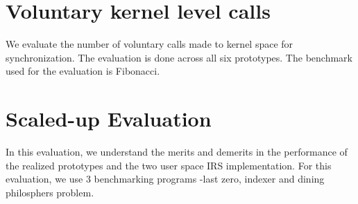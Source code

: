 \section{Voluntary kernel level calls}

We evaluate the number of voluntary calls made to kernel space for synchronization. 
The evaluation is done across all six prototypes. 
The benchmark used for the evaluation is Fibonacci.

\section{Scaled-up Evaluation}

In this evaluation, we understand the merits and demerits in the performance of the realized prototypes and the two user space IRS implementation. 
For this evaluation, we use 3 benchmarking programs -last zero, indexer and dining philosphers problem. 